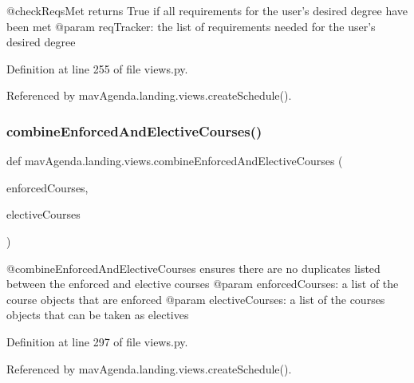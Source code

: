 \begin{DoxyVerb}@checkReqsMet returns True if all requirements for the user's desired degree have been met
@param reqTracker: the list of requirements needed for the user's desired degree
\end{DoxyVerb}
 

Definition at line 255 of file views.\+py.



Referenced by mav\+Agenda.\+landing.\+views.\+create\+Schedule().

\mbox{\label{namespacemavAgenda_1_1landing_1_1views_a49d702ba4703d34075928e3b50d40137}} 
\subsubsection{\texorpdfstring{combine\+Enforced\+And\+Elective\+Courses()}{combineEnforcedAndElectiveCourses()}}
{\footnotesize\ttfamily def mav\+Agenda.\+landing.\+views.\+combine\+Enforced\+And\+Elective\+Courses (\begin{DoxyParamCaption}\item[{}]{enforced\+Courses,  }\item[{}]{elective\+Courses }\end{DoxyParamCaption})}

\begin{DoxyVerb}@combineEnforcedAndElectiveCourses ensures there are no duplicates listed between the enforced and elective courses
@param enforcedCourses: a list of the course objects that are enforced
@param electiveCourses: a list of the courses objects that can be taken as electives
\end{DoxyVerb}
 

Definition at line 297 of file views.\+py.



Referenced by mav\+Agenda.\+landing.\+views.\+create\+Schedule().

\mbox{\label{namespacemavAgenda_1_1landing_1_1views_a760ef282377a3ca2be7eaf4254a99296}} 
